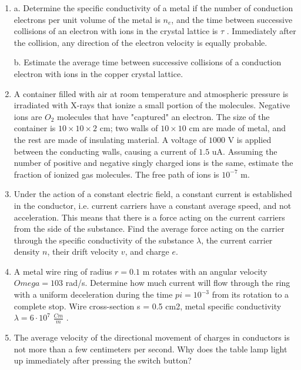 \documentclass{article}
\begin{document}
\begin{enumerate}[label=8.2.\arabic*]


\item a. Determine the specific conductivity of a metal if the number of conduction electrons per unit volume of the metal is $n_e$, and the time between successive collisions of an electron with ions in the crystal lattice is $\tau$ . Immediately after the collision, any direction of the electron velocity is equally probable. 

b. Estimate the average time between successive collisions of a conduction electron with ions in the copper crystal lattice.

\item A container filled with air at room temperature and atmospheric pressure is irradiated with X-rays that ionize a small portion of the molecules. Negative ions are $O_2$ molecules that have "captured" an electron. The size of the container is $10 \times 10 \times 2$ cm; two walls of $10 \times 10$ cm are made of metal, and the rest are made of insulating material. A voltage of $1000$ V is applied between the conducting walls, causing a current of $1.5$ uA. Assuming the number of positive and negative singly charged ions is the same, estimate the fraction of ionized gas molecules. The free path of ions is $10^{-7}$ m.

\item Under the action of a constant electric field, a constant current is established in the conductor, i.e. current carriers have a constant average speed, and not acceleration. This means that there is a force acting on the current carriers from the side of the substance. Find the average force acting on the carrier through the specific conductivity of the substance $\lambda$, the current carrier density $n$, their drift velocity $v$, and charge $e$.

\item A metal wire ring of radius $r = 0.1$ m rotates with an angular velocity $Omega = 103$ rad/s. Determine how much current will flow through the ring with a uniform deceleration during the time $pi = 10^{-3}$ from its rotation to a complete stop. Wire cross-section s = 0.5 cm2, metal specific conductivity $\lambda = 6 \cdot 10^7$ $\frac{Cm}{m}$ .

\item The average velocity of the directional movement of charges in conductors is not more than a few centimeters per second. Why does the table lamp light up immediately after pressing the switch button?


\end{enumerate}
\end{document}
